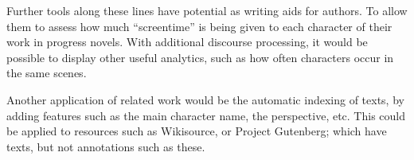 \documentclass[11pt,a4paper]{article}
\begin{document}
Further tools along these lines have potential as writing aids for authors.
To allow them to assess how much ``screentime'' is being given to each character of their work in progress novels.
With additional discourse processing, it would be possible to display other useful analytics, such as how often characters occur in the same scenes.

Another application of related work would be the automatic indexing of texts, by adding features such as the main character name, the perspective, etc.
This could be applied to resources such as Wikisource, or Project Gutenberg;
which have texts, but not annotations such as these.





\end{document}
